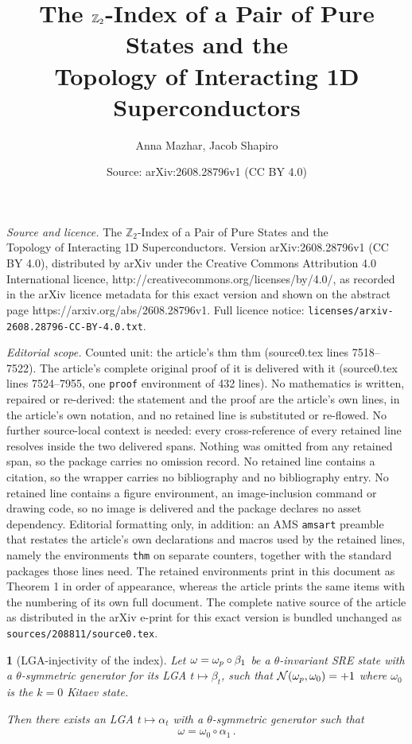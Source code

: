 \documentclass[10pt,a4paper]{amsart}
\title{The $\ZZ_2$-Index of a Pair of Pure States and the\\Topology of Interacting 1D Superconductors}
\author{Anna Mazhar, Jacob Shapiro}
\date{Source: arXiv:2608.28796v1 (CC BY 4.0)}
\newtheorem{thm}{}
\newcommand{\ZZ}{\mathbb{Z}}
\newcommand{\calN}{\mathcal{N}}
\newcommand{\eql}[1]{\begin{align}#1\end{align}}
\begin{document}
\maketitle

\noindent\emph{Source and licence.} The $\ZZ_2$-Index of a Pair of Pure States and the\\Topology of Interacting 1D Superconductors. Version arXiv:2608.28796v1 (CC BY 4.0), distributed by arXiv under the Creative Commons Attribution 4.0 International licence, http://creativecommons.org/licenses/by/4.0/, as recorded in the arXiv licence metadata for this exact version and shown on the abstract page https://arxiv.org/abs/2608.28796v1. Full licence notice: \texttt{licenses/arxiv-2608.28796-CC-BY-4.0.txt}.\par\smallskip

\noindent\textit{Editorial scope.} Counted unit: the article's thm thm (source0.tex lines 7518--7522). The article's complete original proof of it is delivered with it (source0.tex lines 7524--7955, one \texttt{proof} environment of 432 lines). No mathematics is written, repaired or re-derived: the statement and the proof are the article's own lines, in the article's own notation, and no retained line is substituted or re-flowed.  No further source-local context is needed: every cross-reference of every retained line resolves inside the two delivered spans.  Nothing was omitted from any retained span, so the package carries no omission record.  No retained line contains a citation, so the wrapper carries no bibliography and no bibliography entry.  No retained line contains a figure environment, an image-inclusion command or drawing code, so no image is delivered and the package declares no asset dependency.  Editorial formatting only, in addition: an AMS \texttt{amsart} preamble that restates the article's own declarations and macros used by the retained lines, namely the environments \texttt{thm} on separate counters, together with the standard packages those lines need.  The retained environments print in this document as Theorem 1 in order of appearance, whereas the article prints the same items with the numbering of its own full document.  The complete native source of the article as distributed in the arXiv e-print for this exact version is bundled unchanged as \texttt{sources/208811/source0.tex}.
\begin{thm}[LGA-injectivity of the index] Let $\omega=\omega_{\rm p}\circ\beta_1$ be a $\theta$-invariant SRE state with a $\theta$-symmetric generator for its LGA $t\mapsto\beta_t$, such that $\calN(\omega_{\rm p},\omega_0)=+1$ where $\omega_0$ is the $k=0$ Kitaev state.

Then there exists an LGA $t\mapsto \alpha_t$ with a $\theta$-symmetric generator such that 
\eql{\omega = \omega_0\circ\alpha_1\,.} 
\end{thm}
\end{document}
